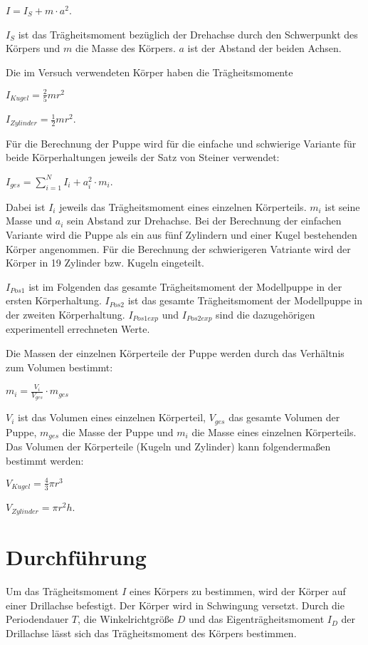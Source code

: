     $I = I_S + m \cdot a^2$.

    $I_S$ ist das Trägheitsmoment bezüglich der Drehachse durch 
    den Schwerpunkt des Körpers und $m$ die Masse des Körpers.
    $a$ ist der Abstand der beiden Achsen.

    Die im Versuch verwendeten Körper haben die
    Trägheitsmomente

    $I_{Kugel} = \frac{2}{5} m r^2$

    $I_{Zylinder} = \frac{1}{2} m r^2$.

    Für die Berechnung der Puppe wird für die einfache und schwierige Variante für beide
    Körperhaltungen jeweils der Satz von Steiner verwendet:

    $I_{ges} = \sum_{i=1}^N I_i + a_i^2 \cdot m_i$.

    Dabei ist $I_i$ jeweils das Trägheitsmoment eines einzelnen Körperteils.
    $m_i$ ist seine Masse und $a_i$ sein Abstand zur Drehachse.
    Bei der Berechnung der einfachen Variante wird die Puppe als ein aus
    fünf Zylindern und einer Kugel bestehenden Körper angenommen.
    Für die Berechnung der schwierigeren Vatriante wird der Körper in
    19 Zylinder bzw. Kugeln eingeteilt.

    $I_{Pos1}$ ist im Folgenden das gesamte Trägheitsmoment der Modellpuppe
    in der ersten Körperhaltung. $I_{Pos2}$ ist das gesamte
    Trägheitsmoment der Modellpuppe in der zweiten Körperhaltung.
    $I_{Pos1exp}$ und $I_{Pos2exp}$ sind die dazugehörigen experimentell
    errechneten Werte.

    Die Massen der einzelnen Körperteile der Puppe werden durch das Verhältnis
    zum Volumen bestimmt:

    $m_{i} = \frac{V_{i}}{V_{ges}} \cdot m_{ges}$

    $V_{i}$ ist das Volumen eines einzelnen Körperteil, $V_{ges}$ das gesamte Volumen der Puppe, $m_{ges}$
    die Masse der Puppe und $m_{i}$ die Masse eines einzelnen Körperteils.
    Das Volumen der Körperteile (Kugeln und Zylinder) kann folgendermaßen bestimmt werden:

    $V_{Kugel} = \frac{4}{3} \pi r^3$

    $V_{Zylinder} = \pi r^2 h$.

    \section{Durchführung}
    Um das Trägheitsmoment $I$ eines Körpers zu
    bestimmen, wird der Körper auf einer Drillachse
    befestigt. Der Körper wird in Schwingung versetzt.
    Durch die Periodendauer $T$, die Winkelrichtgröße
    $D$ und das Eigenträgheitsmoment $I_D$ der Drillachse lässt
    sich das Trägheitsmoment des Körpers bestimmen.

